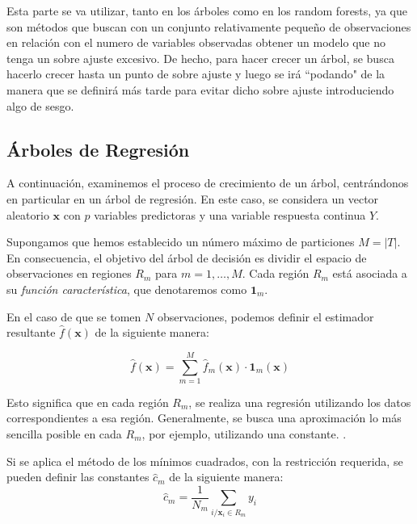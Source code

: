 \noindent Esta parte se va utilizar, tanto en los árboles como en los random forests, ya que son métodos que buscan con un conjunto relativamente pequeño de observaciones en relación con el numero de variables observadas obtener un modelo que no tenga un sobre ajuste excesivo. De hecho, para hacer crecer un árbol, se busca hacerlo crecer hasta un punto de sobre ajuste y luego se irá ``podando" de la manera que se definirá más tarde para evitar dicho sobre ajuste introduciendo algo de sesgo. 
 
\newpage
\subsection{Árboles de Regresión}

\noindent A continuación, examinemos el proceso de crecimiento de un árbol, centrándonos en particular en un árbol de regresión. En este caso, se considera un vector aleatorio $\mathbf{x}$ con $p$ variables predictoras y una variable respuesta continua $Y$.

\noindent Supongamos que hemos establecido un número máximo de particiones $M=|T|$. En consecuencia, el objetivo del árbol de decisión es dividir el espacio de observaciones en regiones $R_m$ para $m=1,\ldots, M$. Cada región $R_m$ está asociada a su \emph{función característica}, que denotaremos como $\mathbf{1}_m$.

\noindent En el caso de que se tomen $N$ observaciones, podemos definir el estimador resultante $\hat{f}(\mathbf{x})$ de la siguiente manera:

\begin{equation}
\hat{f}(\mathbf{x})=\sum_{m=1}^M \hat{f}_m(\mathbf{x})\cdot \mathbf{1}_m(\mathbf{x})
\end{equation}

\noindent Esto significa que en cada región $R_m$, se realiza una regresión utilizando los datos correspondientes a esa región. Generalmente, se busca una aproximación lo más sencilla posible en cada $R_m$, por ejemplo, utilizando una constante. \cite{Hastie 2001,Biau 2016}.

\noindent Si se aplica el método de los mínimos cuadrados, con la restricción requerida, se pueden definir las constantes $\hat{c}_m$ de la siguiente manera:
\begin{equation}
\hat{c}_m=\dfrac{1}{N_m}\sum_{i/\mathbf{x}_i\in R_m} y_i
\end{equation}

